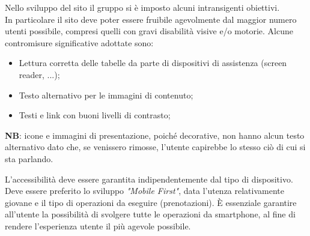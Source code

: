 Nello sviluppo del sito il gruppo si è imposto alcuni intransigenti obiettivi.\\
In particolare il sito deve poter essere fruibile agevolmente dal maggior numero utenti possibile, compresi quelli con gravi disabilità visive e/o
motorie. Alcune contromisure significative adottate sono:
\begin{itemize}
	\item Lettura corretta delle tabelle da parte di dispositivi di assistenza (screen reader, ...);
	\item Testo alternativo per le immagini di contenuto;
	\item Testi e link con buoni livelli di contrasto;
\end{itemize}

\textbf{NB}: icone e immagini di presentazione, poiché decorative, non hanno alcun testo alternativo dato che, se venissero rimosse, l'utente capirebbe lo stesso ciò di cui si sta parlando.

L'accessibilità deve essere garantita indipendentemente dal tipo di dispositivo. Deve essere preferito lo sviluppo \textit{"Mobile First"}, data l'utenza relativamente giovane e il tipo di operazioni da eseguire (prenotazioni). È essenziale garantire all'utente la possibilità di svolgere tutte le operazioni da smartphone, al fine di rendere l'esperienza utente il più agevole possibile.\\[0.2cm]
